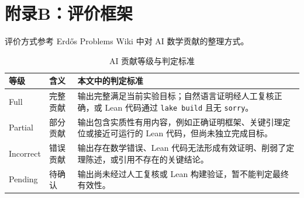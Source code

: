 \newpage
{}
\section*{附录B：评价框架}

评价方式参考 Erdős Problems Wiki 中对 AI 数学贡献的整理方式\cite{TaoErdosAIWiki2026}。

\begin{table}[H]
\centering
\small
\setlength{\tabcolsep}{3pt}
\caption{AI 贡献等级与判定标准}
\label{tab:appendix-ai-contribution-levels}
\begin{tabular}{@{}>{\raggedright\arraybackslash}p{}>{\raggedright\arraybackslash}p{}>{\raggedright\arraybackslash}p{}@{}}
\toprule
\textbf{等级} & \textbf{含义} & \textbf{本文中的判定标准} \\
\midrule
Full & 完整贡献 & 输出完整满足当前实验目标；自然语言证明经人工复核正确，或 Lean 代码通过 \texttt{lake build} 且无 \texttt{sorry}。 \\
Partial & 部分贡献 & 输出包含实质性有用内容，例如正确证明框架、关键引理定位或接近可运行的 Lean 代码，但尚未独立完成目标。 \\
Incorrect & 错误贡献 & 输出存在数学错误、Lean 代码无法形成有效证明、削弱了定理陈述，或引用不存在的关键结论。 \\
Pending & 待确认 & 输出尚未经过人工复核或 Lean 构建验证，暂不能判定最终有效性。 \\
\bottomrule
\end{tabular}
\end{table}

